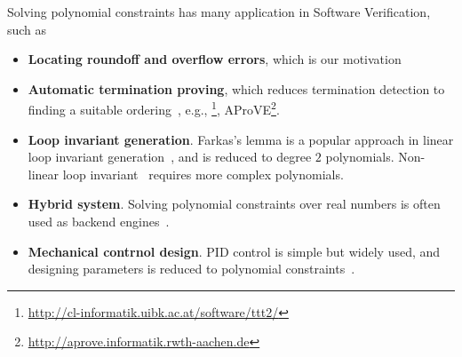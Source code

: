 %
Solving polynomial constraints has many application in Software Verification, such as 
\begin{itemize}
\item {\bf Locating roundoff and overflow errors}, 
which is our motivation~\cite{Ngoc:2009:ORE:1685167.1685421,Ngoc:2010:CRE:1858996.1859056}

\item {\bf Automatic termination proving}, 
which reduces termination detection to finding a suitable ordering~\cite{Lucas:2008:CCS:1361735.1361760}, 
e.g., \TTTT\footnote{\url{http://cl-informatik.uibk.ac.at/software/ttt2/}}, 
AProVE\footnote{\url{http://aprove.informatik.rwth-aachen.de}}. 

\item {\bf Loop invariant generation}. 
Farkas's lemma is a popular approach in linear loop invariant generation~\cite{Colon}, 
and is reduced to degree $2$ polynomials. 
Non-linear loop invariant~\cite{Sankaranarayanan:2004:NLI:982962.964028} requires more complex polynomials.

\item {\bf Hybrid system}. Solving polynomial constraints over real numbers is often used as backend engines~\cite{Sankaranarayanan04constructinginvariants}. 

\item {\bf Mechanical contrnol design}. 
PID control is simple but widely used, and designing parameters is 
reduced to polynomial constraints~\cite{control}. 
\end{itemize}	

